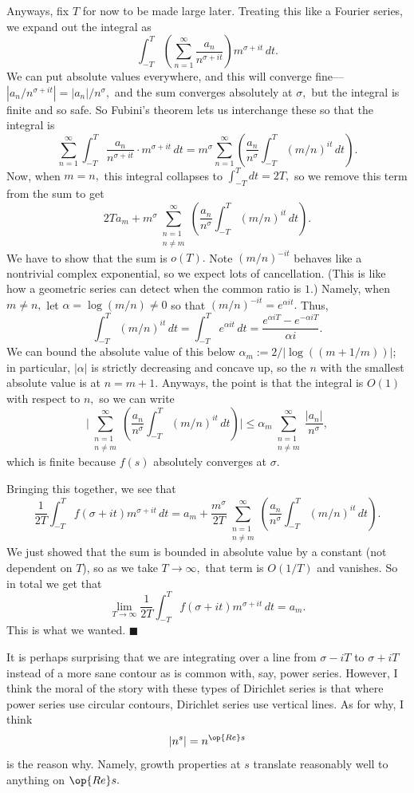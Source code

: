 Anyways, fix $T$ for now to be made large later. Treating this like a Fourier series, we expand out the integral as
\[\int_{-T}^T\left(\sum_{n=1}^\infty\frac{a_n}{n^{\sigma+it}}\right)m^{\sigma+it}\,dt.\]
We can put absolute values everywhere, and this will converge fine---$|a_n/n^{\sigma+it}|=|a_n|/n^\sigma,$ and the sum converges absolutely at $\sigma,$ but the integral is finite and so safe. So Fubini's theorem lets us interchange these so that the integral is
\[\sum_{n=1}^\infty\int_{-T}^T\frac{a_n}{n^{\sigma+it}}\cdot m^{\sigma+it}\,dt=m^\sigma\sum_{n=1}^\infty\left(\frac{a_n}{n^\sigma}\int_{-T}^T(m/n)^{it}\,dt\right).\]
Now, when $m=n,$ this integral collapses to $\int_{-T}^Tdt=2T,$ so we remove this term from the sum to get
\[2Ta_m+m^\sigma\sum_{\substack{n=1\\n\ne m}}^\infty\left(\frac{a_n}{n^\sigma}\int_{-T}^T(m/n)^{it}\,dt\right).\]
We have to show that the sum is $o(T).$ Note $(m/n)^{-it}$ behaves like a nontrivial complex exponential, so we expect lots of cancellation. (This is like how a geometric series can detect when the common ratio is $1.$) Namely, when $m\ne n,$ let $\alpha=\log(m/n)\ne0$ so that $(m/n)^{-it}=e^{\alpha it}.$ Thus,
\[\int_{-T}^T(m/n)^{it}\,dt=\int_{-T}^Te^{\alpha it}\,dt=\frac{e^{\alpha iT}-e^{-\alpha iT}}{\alpha i}.\]
We can bound the absolute value of this below $\alpha_m:=2/|\log((m+1/m))|$; in particular, $|\alpha|$ is strictly decreasing and concave up, so the $n$ with the smallest absolute value is at $n=m+1.$ Anyways, the point is that the integral is $O(1)$ with respect to $n,$ so we can write
\[\Bigg|\sum_{\substack{n=1\\n\ne m}}^\infty\left(\frac{a_n}{n^\sigma}\int_{-T}^T(m/n)^{it}\,dt\right)\Bigg|\le\alpha_m\sum_{\substack{n=1\\n\ne m}}^\infty\frac{|a_n|}{n^\sigma},\]
which is finite because $f(s)$ absolutely converges at $\sigma.$

Bringing this together, we see that
\[\frac1{2T}\int_{-T}^Tf(\sigma+it)m^{\sigma+it}\,dt=a_m+\frac{m^\sigma}{2T}\sum_{\substack{n=1\\n\ne m}}^\infty\left(\frac{a_n}{n^\sigma}\int_{-T}^T(m/n)^{it}\,dt\right).\]
We just showed that the sum is bounded in absolute value by a constant (not dependent on $T$), so as we take $T\to\infty,$ that term is $O(1/T)$ and vanishes. So in total we get that
\[\lim_{T\to\infty}\frac1{2T}\int_{-T}^Tf(\sigma+it)m^{\sigma+it}\,dt=a_m.\]
This is what we wanted. $\blacksquare$

It is perhaps surprising that we are integrating over a line from $\sigma-iT$ to $\sigma+iT$ instead of a more sane contour as is common with, say, power series. However, I think the moral of the story with these types of Dirichlet series is that where power series use circular contours, Dirichlet series use vertical lines. As for why, I think
\[\left|n^s\right|=n^{\op{Re}s}\]
is the reason why. Namely, growth properties at $s$ translate reasonably well to anything on $\op{Re}s.$

